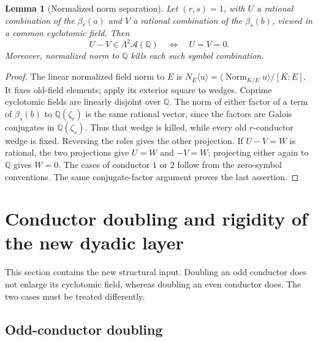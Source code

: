 \documentclass[11pt]{article}
\numberwithin{equation}{section}
\newtheorem{lemma}[theorem]{Lemma}
\theoremstyle{definition}
\theoremstyle{remark}
\newcommand{\Q}{\mathbb Q}
\newcommand{\A}{\mathcal A}
\newcommand{\cl}[1]{\langle #1\rangle}
\DeclareMathOperator{\Norm}{Norm}
\begin{document}
\begin{lemma}[Normalized norm separation]\label{lem:norm}
Let $(r,s)=1$, with $U$ a rational combination of the $\beta_r(a)$ and
$V$ a rational combination of the $\beta_s(b)$, viewed in a common
cyclotomic field. Then
\[
 U-V\in\Lambda^2\A(\Q)\quad\Longleftrightarrow\quad U=V=0.
\]
Moreover, normalized norm to $\Q$ kills each such symbol combination.
\end{lemma}
\begin{proof}
The linear normalized field norm to $E$ is
$N_E\cl u=\cl{\Norm_{K/E}u}/[K:E]$. It fixes old-field elements;
apply its exterior square to wedges. Coprime cyclotomic fields are
linearly disjoint over $\Q$. The norm of either factor of a term of
$\beta_s(b)$ to $\Q(\zeta_r)$ is the same rational vector, since the
factors are Galois conjugates in $\Q(\zeta_s)$. Thus that wedge is
killed, while every old $r$-conductor wedge is fixed. Reversing the
roles gives the other projection. If $U-V=W$ is rational, the two
projections give $U=W$ and $-V=W$; projecting either again to $\Q$
gives $W=0$. The cases of conductor $1$ or $2$ follow from the
zero-symbol conventions. The same conjugate-factor argument proves
the last assertion.
\end{proof}


\section{Conductor doubling and rigidity of the new dyadic layer}
\label{sec:dyadic}

This section contains the new structural input. Doubling an odd conductor
does not enlarge its cyclotomic field, whereas doubling an even conductor
does. The two cases must be treated differently.

\subsection{Odd-conductor doubling}
\end{document}
